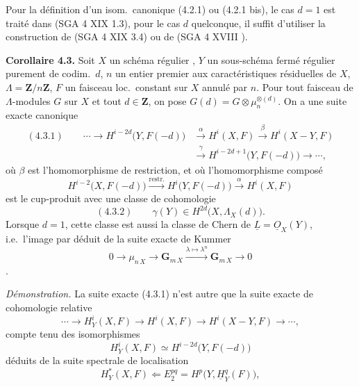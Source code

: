 \documentclass[11pt,a4paper]{article}
\begin{document}
Pour la définition d'un isom.\ canonique (4.2.1) ou (4.2.1 bis), le cas $d = 1$ est traité dans (SGA 4 XIX 1.3),  pour le cas $d$ quelconque, il suffit d'utiliser la construction de (SGA 4 XIX 3.4) ou de (SGA 4 XVIII \quad ).


\textbf{Corollaire 4.3.} Soit $X$ un schéma \struck{\ill{}} régulier \struck{\ill{}} , $Y$ un sous-schéma fermé régulier purement de codim.\ $d$, $n$ un entier premier aux caractéristiques résiduelles de $X$, $\Lambda = \mathbf{Z}/n\mathbf{Z}$, $F$ un faisceau loc.\ constant sur $X$ annulé par $n$. Pour tout faisceau de $\Lambda$-modules $G$ sur $X$ et tout $d \in \mathbf{Z}$, on pose $G(d) = G \otimes \mu_n^{\otimes(d)}$.  On a une suite exacte canonique
\[
\begin{aligned}
(4.3.1) \qquad \cdots \to H^{i-2d}\bigl(Y, F(-d)\bigr) &\xrightarrow{\alpha} H^i(X, F) \xrightarrow{\beta} H^i(X - Y, F) \\
&\xrightarrow{\gamma} H^{i-2d+1}\bigl(Y, F(-d)\bigr) \to \cdots ,
\end{aligned}
\]
où $\beta$ est l'homomorphisme de restriction, et où l'homomorphisme composé
\[
H^{i-2}\bigl(X, F(-d)\bigr) \xrightarrow{\text{restr.}} H^i\bigl(Y, F(-d)\bigr) \xrightarrow{\alpha} H^i(X, F)
\]
est le cup-produit avec une classe de cohomologie
\[
(4.3.2) \qquad \gamma(Y) \in H^{2d}\bigl(X, \Lambda_X(d)\bigr) .
\]
 Lorsque $d = 1$, cette classe est aussi la  classe de Chern de $\underline{L} = \underline{O}_X(Y)$, i.e.\ l'image par  \ill{} déduit de la suite exacte de Kummer
\[
0 \to \mu_{n\,X} \to \mathbf{G}_{m\,X} \xrightarrow{\lambda \mapsto \lambda^n} \mathbf{G}_{m\,X} \to 0
\]
.

\emph{Démonstration.}  La suite exacte (4.3.1) n'est autre que la suite exacte de cohomologie relative
\[
\cdots \to H^i_Y(X, F) \to H^i(X, F) \to H^i(X - Y, F) \to \cdots ,
\]
compte tenu des isomorphismes
\[
H^i_Y(X, F) \simeq H^{i-2d}\bigl(Y, F(-d)\bigr)
\]
déduits de la suite spectrale de localisation
\[
H^*_Y(X, F) \Longleftarrow E_2^{pq} = H^p\bigl(Y, \underline{H}^q_Y(F)\bigr) ,
\]
\end{document}

